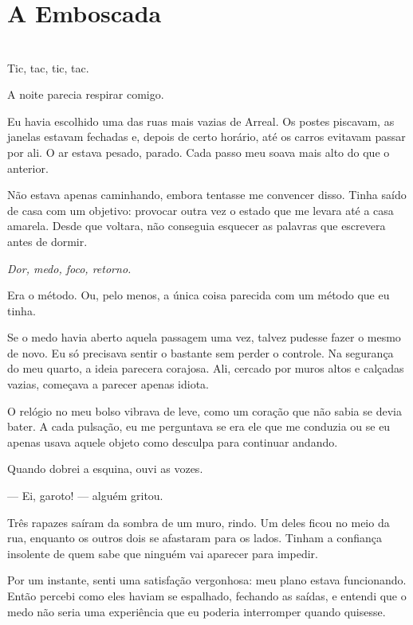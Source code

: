 \newpage

\ifdefined\useChapters
\chapter{A Emboscada}
\else
\chapter{}
\fi

Tic, tac, tic, tac.

A noite parecia respirar comigo.

Eu havia escolhido uma das ruas mais vazias de Arreal. Os postes piscavam, as janelas estavam fechadas e, depois de certo horário, até os carros evitavam passar por ali. O ar estava pesado, parado. Cada passo meu soava mais alto do que o anterior.

Não estava apenas caminhando, embora tentasse me convencer disso. Tinha saído de casa com um objetivo: provocar outra vez o estado que me levara até a casa amarela. Desde que voltara, não conseguia esquecer as palavras que escrevera antes de dormir.

\emph{Dor, medo, foco, retorno.}

Era o método. Ou, pelo menos, a única coisa parecida com um método que eu tinha.

Se o medo havia aberto aquela passagem uma vez, talvez pudesse fazer o mesmo de novo. Eu só precisava sentir o bastante sem perder o controle. Na segurança do meu quarto, a ideia parecera corajosa. Ali, cercado por muros altos e calçadas vazias, começava a parecer apenas idiota.

O relógio no meu bolso vibrava de leve, como um coração que não sabia se devia bater. A cada pulsação, eu me perguntava se era ele que me conduzia ou se eu apenas usava aquele objeto como desculpa para continuar andando.

Quando dobrei a esquina, ouvi as vozes.

— Ei, garoto! — alguém gritou.

Três rapazes saíram da sombra de um muro, rindo. Um deles ficou no meio da rua, enquanto os outros dois se afastaram para os lados. Tinham a confiança insolente de quem sabe que ninguém vai aparecer para impedir.

Por um instante, senti uma satisfação vergonhosa: meu plano estava funcionando. Então percebi como eles haviam se espalhado, fechando as saídas, e entendi que o medo não seria uma experiência que eu poderia interromper quando quisesse.

